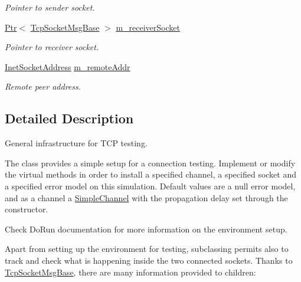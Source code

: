 \begin{DoxyCompactItemize}
\begin{DoxyCompactList}\small\item\em Pointer to sender socket. \end{DoxyCompactList}\item 
\hyperlink{classns3_1_1Ptr}{Ptr}$<$ \hyperlink{classns3_1_1TcpSocketMsgBase}{Tcp\+Socket\+Msg\+Base} $>$ \hyperlink{classns3_1_1TcpGeneralTest_aeb0ade2e5c50f9a8d7e1ec8c6089812f}{m\+\_\+receiver\+Socket}
\begin{DoxyCompactList}\small\item\em Pointer to receiver socket. \end{DoxyCompactList}\item 
\hyperlink{classns3_1_1InetSocketAddress}{Inet\+Socket\+Address} \hyperlink{classns3_1_1TcpGeneralTest_af9ea796c36541a73091f35f7bd052694}{m\+\_\+remote\+Addr}
\begin{DoxyCompactList}\small\item\em Remote peer address. \end{DoxyCompactList}\end{DoxyCompactItemize}


\subsection{Detailed Description}
General infrastructure for T\+CP testing. 

The class provides a simple setup for a connection testing. Implement or modify the virtual methods in order to install a specified channel, a specified socket and a specified error model on this simulation. Default values are a null error model, and as a channel a \hyperlink{classns3_1_1SimpleChannel}{Simple\+Channel} with the propagation delay set through the constructor.

Check Do\+Run documentation for more information on the environment setup.

Apart from setting up the environment for testing, subclassing permits also to track and check what is happening inside the two connected sockets. Thanks to \hyperlink{classns3_1_1TcpSocketMsgBase}{Tcp\+Socket\+Msg\+Base}, there are many information provided to children\+:


